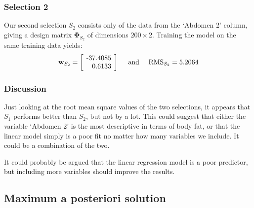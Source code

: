 \documentclass{article}
\newcommand{\vect}[1]{\ensuremath{\boldsymbol{\mathbf{#1}}}\xspace}
\begin{document}
\subsubsection{Selection 2}

Our second selection $S_2$ consists only of the data from the `Abdomen
2' column, giving a design matrix $\vect{\Phi}_{S_2}$ of dimensions
$200\times 2$. Training the model on the same training data yields:
\[
\vect{w}_{S_2} = \left[\!\begin{tabular}{r@{.}l}
  -37 & 4085\\
  0 & 6133
  \end{tabular}\!\right]\quad
\text{ and }\quad \mathrm{RMS}_{S_2} = 5.2064
\]

\subsubsection{Discussion}
Just looking at the root mean square values of the two selections, it
appears that $S_1$ performs better than $S_2$, but not by a lot. This
could suggest that either the variable `Abdomen 2' is the most descriptive
in terms of body fat, or that the linear model simply is a poor fit no
matter how many variables we include. It could be a combination of the
two.

It could probably be argued that the linear regression model is a poor
predictor, but including more variables should improve the results.

\subsection{Maximum a posteriori solution}

\end{document}
